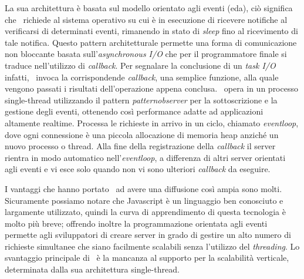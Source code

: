 La sua architettura è basata sul modello orientato agli eventi (\acrshort{eda}), ciò significa che \nodejs~richiede al sistema operativo su cui è in esecuzione di ricevere notifiche al verificarsi di determinati eventi, rimanendo in stato di \textit{sleep} fino al ricevimento di tale notifica. Questo pattern architetturale permette una forma di comunicazione non bloccante basata sull'\textit{asynchronous I/O} che per il programmatore finale si traduce nell'utilizzo di \textit{\gls{callback}}. Per segnalare la conclusione di un \textit{task I/O} infatti, \nodejs~invoca la corrispondende \textit{\gls{callback}}, una semplice funzione, alla quale vengono passati i risultati dell'operazione appena conclusa.
\nodejs~opera in un processo single-thread utilizzando il pattern \textit{\acrshort{patternobserver}} per la sottoscrizione e la gestione degli eventi, ottenendo così performance adatte ad applicazioni altamente realtime. Processa le richieste in arrivo in un ciclo, chiamato \textit{\gls{eventloop}}, dove ogni connessione è una piccola allocazione di memoria heap anziché un nuovo processo o thread. Alla fine della registrazione della \textit{\gls{callback}} il server rientra in modo automatico nell'\textit{\gls{eventloop}}, a differenza di altri server orientati agli eventi e vi esce solo quando non vi sono ulteriori \textit{\gls{callback}} da eseguire.

I vantaggi che hanno portato \nodejs~ad avere una diffusione così ampia sono molti. Sicuramente possiamo notare che Javascript è un linguaggio ben conosciuto e largamente utilizzato, quindi la curva di apprendimento di questa tecnologia è molto più breve; offrendo inoltre la programmazione orientata agli eventi permette agli sviluppatori di creare server in grado di gestire un alto numero di richieste simultanee che siano facilmente scalabili senza l'utilizzo del \textit{threading}. Lo svantaggio principale di \nodejs~è la mancanza al supporto per la scalabilità verticale, determinata dalla sua architettura single-thread.


